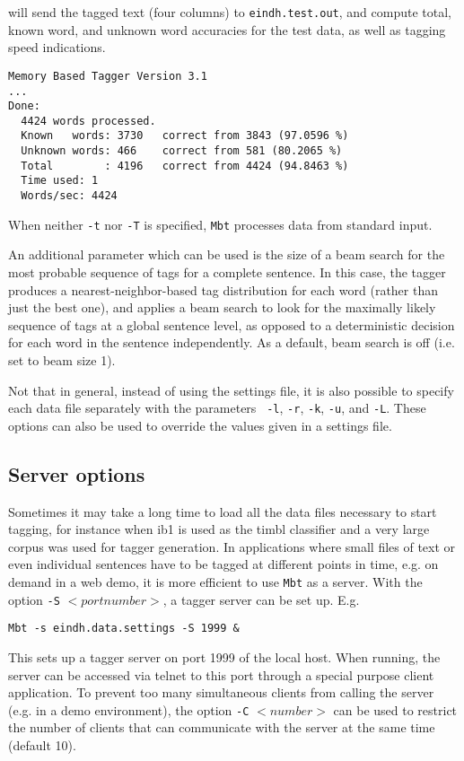 \documentclass{report}
\begin{document}
will send the tagged text (four columns) to {\tt eindh.test.out},
and compute total, known word, and unknown word accuracies for the
test data, as well as tagging speed indications.

{\small
\begin{verbatim}
Memory Based Tagger Version 3.1
...
Done:
  4424 words processed.
  Known   words: 3730   correct from 3843 (97.0596 %)
  Unknown words: 466    correct from 581 (80.2065 %)
  Total        : 4196   correct from 4424 (94.8463 %)
  Time used: 1
  Words/sec: 4424
\end{verbatim}
}

When neither {\tt -t} nor {\tt -T} is specified, {\tt Mbt} processes data from
standard input.

An additional parameter which can be used is the size of a beam search
for the most probable sequence of tags for a complete sentence. In
this case, the tagger produces a nearest-neighbor-based tag
distribution for each word (rather than just the best one), and
applies a beam search to look for the maximally likely sequence of tags
at a global sentence level, as opposed to a deterministic decision for
each word in the sentence independently. As a default, beam search is
off (i.e. set to beam size 1).

Not that in general, instead of using the settings file, it is also
possible to specify each data file separately with the parameters {\tt
  -l}, {\tt -r}, {\tt -k}, {\tt -u}, and {\tt -L}. These options can
also be used to override the values given in a settings file.


\subsection{Server options}

Sometimes it may take a long time to load all the data files necessary
to start tagging, for instance when {\sc ib1} is used as the {\sc
timbl} classifier and a very large corpus was used for tagger
generation. In applications where small files of text or even
individual sentences have to be tagged at different points in time,
e.g. on demand in a web demo, it is more efficient to use {\tt Mbt} as
a server. With the option {\tt -S} $<portnumber>$, a tagger server can be
set up. E.g.

{\small
\begin{verbatim}
Mbt -s eindh.data.settings -S 1999 &
\end{verbatim}
}

This sets up a tagger server on port 1999 of the local host. When
running, the server can be accessed via telnet to this port through a
special purpose client application. To prevent too many simultaneous
clients from calling the server (e.g. in a demo environment), the
option {\tt -C} $<number>$ can be used to restrict the number of
clients that can communicate with the server at the same time (default
10).
\end{document}
